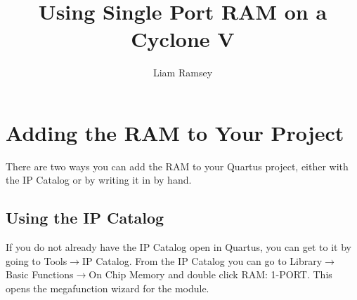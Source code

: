 \documentclass[letter,12pt]{article}
\title{Using Single Port RAM on a Cyclone V}
\author{Liam Ramsey}
\begin{document}
\maketitle

\section{Adding the RAM to Your Project}
There are two ways you can add the RAM to your Quartus project, either with the IP Catalog or by writing it in by hand.

\subsection{Using the IP Catalog}
If you do not already have the IP Catalog open in Quartus, you can get to it by going to Tools$\rightarrow$IP Catalog. From the IP Catalog you can go to Library$\rightarrow$Basic Functions$\rightarrow$On Chip Memory and double click RAM: 1-PORT. This opens the megafunction wizard for the module.
\end{document}
